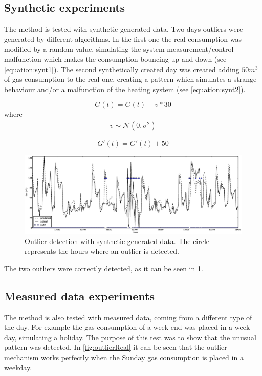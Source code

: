 \documentclass{sig-alternate-sigmod07}
\begin{document}
\subsection{Synthetic experiments}
The method is tested with synthetic generated data. Two days outliers were generated by different algorithms. In the first one the real consumption was modified by a random value, simulating the system measurement/control malfunction which makes the consumption bouncing up and down (see \cref{equation:synt1}). The second synthetically created day was created adding $50 m^3$ of gas consumption to the real one, creating a pattern which simulates a strange behaviour and/or a malfunction of the heating system (see \cref{equation:synt2}).

\begin{equation}G(t)= G(t)+v*30\label{equation:synt1} \end{equation}
where 
\begin{align*}v \sim \mathcal{N} (0,\sigma^2) \end{align*}

\begin{equation}G'(t)= G'(t)+50\label{equation:synt2} \end{equation}

\begin{figure}
\centering
\includegraphics[width=\textwidth]{images/outliersSynt.eps}
\caption{Outlier detection with synthetic generated data. The circle represents the hours where an outlier is detected.}
\label{fig:outlierSynt}
\end{figure}

The two outliers were correctly detected, as it can be seen in \cref{fig:outlierSynt}.



\subsection{Measured data experiments}
The method is also tested with measured data, coming from a different type of the day. For example the gas consumption of a week-end was placed in a week-day, simulating a holiday. The purpose of this test was to show that the unusual pattern was detected. In \cref{fig:outlierReal} it can be seen that the outlier mechanism works perfectly when the Sunday gas consumption is placed in a weekday. 
\end{document}
